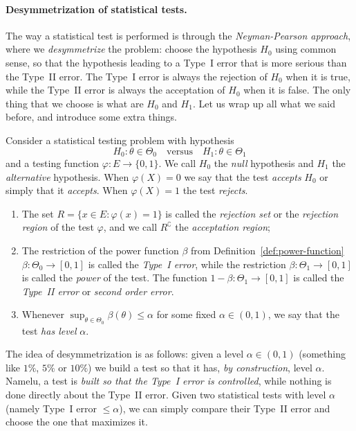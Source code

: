 \documentclass[
	fontsize=11pt, %
	twoside=false, %
	numbers=noenddot, %
]{kaobook}
\newcommand{\E}{\mathbb E}
\newcommand{\goes}{\rightarrow}
\begin{document}

\paragraph{Desymmetrization of statistical tests.} %

The way a statistical test is performed is through the \emph{Neyman-Pearson approach}, where we  \emph{desymmetrize} the problem: choose the hypothesis $H_0$ using common sense, so that the hypothesis leading to a Type~I error that is more serious than the Type~II error.
The Type~I error is always the rejection of $H_0$ when it is true, while the Type~II error is always the acceptation of $H_0$ when it is false.
The only thing that we choose is what are $H_0$ and $H_1$.
Let us wrap up all what we said before, and introduce some extra things.
\begin{definition}
	\label{def:test-definitions}
	Consider a statistical testing problem with hypothesis
	\begin{equation*}
		H_0 : \theta \in \Theta_0 \quad \text{versus} \quad H_1 : \theta \in \Theta_1
	\end{equation*}
	and a testing function $\varphi : E \goes \{ 0, 1 \}$.
	We call $H_0$ the \emph{null} hypothesis and $H_1$ the \emph{alternative} hypothesis.
	When $\varphi(X) = 0$ we say that the test \emph{accepts} $H_0$ or simply that it \emph{accepts}. When $\varphi(X) = 1$ the test \emph{rejects}.
	\begin{enumerate}
		\item The set $R = \{ x \in E : \varphi(x) = 1 \}$ is called the \emph{rejection set} or the \emph{rejection region} of the test $\varphi$, and we call $R^\complement$ the \emph{acceptation region};
		\item The restriction of the power function $\beta$ from Definition~\ref{def:power-function} $\beta : \Theta_0 \goes [0, 1]$ is called the \emph{Type~I error}, while the restriction $\beta : \Theta_1 \goes [0, 1]$ is called the \emph{power} of the test. The function $1 - \beta : \Theta_1 \goes [0, 1]$ is called the \emph{Type~II error} or \emph{second order error}.
		\item Whenever $\sup_{\theta \in \Theta_0} \beta(\theta) \leq \alpha$ for some fixed $\alpha \in (0, 1)$, we say that the test \emph{has level} $\alpha$.
	\end{enumerate}
\end{definition}
The idea of desymmetrization is as follows: given a level $\alpha \in (0, 1)$ (something like $1\%$, $5\%$ or $10\%$) we build a test so that it has, \emph{by construction}, level $\alpha$.
Namelu, a test is \emph{built so that the Type~I error is controlled}, while nothing is done directly about the Type~II error.
Given two statistical tests with level $\alpha$ (namely Type~I error $\leq \alpha$), we can simply compare their Type~II error and choose the one that maximizes it.
\end{document}
